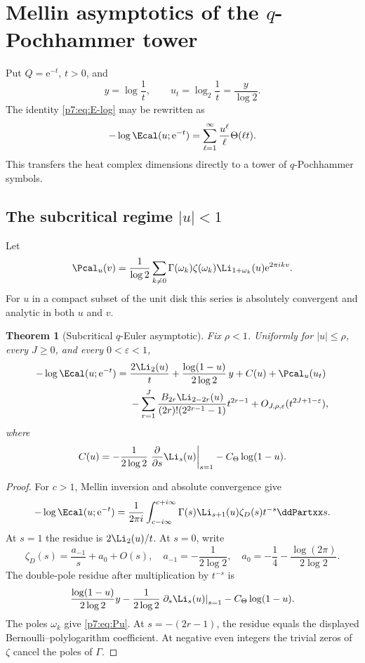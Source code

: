 \documentclass[11pt]{article}
\numberwithin{equation}{section}
\newtheorem{theorem}{Theorem}[section]
\theoremstyle{definition}
\theoremstyle{remark}
\newcommand{\e}{\mathrm e}
\begin{document}
\section{Mellin asymptotics of the $q$-Pochhammer tower}

Put $Q=\e^{-t}$, $t>0$, and
\[
 y=\log\frac1t,
 \qquad
 u_t=\log_2\frac1t=\frac y{\log2}.
\]
The identity \cref{p7:eq:E-log} may be rewritten as
\begin{equation}\label{p7:eq:E-Theta}
 -\log\Ecal(u;\e^{-t})
 =\sum_{\ell=1}^{\infty}\frac{u^\ell}{\ell}\Theta(\ell t).
\end{equation}
This transfers the heat complex dimensions directly to a tower of $q$-Pochhammer symbols.

\subsection{The subcritical regime $|u|<1$}

Let
\begin{equation}\label{p7:eq:Pu}
 \Pcal_u(v)=\frac1{\log2}
 \sum_{k\ne0}\Gamma(\omega_k)\zeta(\omega_k)
 \Li_{1+\omega_k}(u)\e^{2\pi ikv}.
\end{equation}
For $u$ in a compact subset of the unit disk this series is absolutely convergent and analytic in both $u$ and $v$.

\begin{theorem}[Subcritical $q$-Euler asymptotic]\label{p7:thm:E-subcritical}
Fix $\rho<1$.  Uniformly for $|u|\le\rho$, every $J\ge0$, and every $0<\varepsilon<1$,
\begin{align}\label{p7:eq:E-subcritical-asymp}
 -\log\Ecal(u;\e^{-t})
 ={}&\frac{2\Li_2(u)}t
 +\frac{\log(1-u)}{2\log2}\,y
 +C(u)+\Pcal_u(u_t)\\
 &-\sum_{r=1}^{J}
 \frac{B_{2r}\Li_{2-2r}(u)}{(2r)!(2^{2r-1}-1)}t^{2r-1}
 +O_{J,\rho,\varepsilon}(t^{2J+1-\varepsilon}),\notag
\end{align}
where
\begin{equation}\label{p7:eq:Cu}
 C(u)=-\frac1{2\log2}
 \left.\frac{\partial}{\partial s}\Li_s(u)\right|_{s=1}
 -C_\Theta\log(1-u).
\end{equation}
\end{theorem}

\begin{proof}
For $c>1$, Mellin inversion and absolute convergence give
\begin{equation}\label{p7:eq:E-Mellin}
 -\log\Ecal(u;\e^{-t})
 =\frac1{2\pi i}\int_{c-i\infty}^{c+i\infty}
 \Gamma(s)\Li_{s+1}(u)\zeta_D(s)t^{-s}\ddPartxx s.
\end{equation}
At $s=1$ the residue is $2\Li_2(u)/t$.  At $s=0$, write
\[
 \zeta_D(s)=\frac{a_{-1}}s+a_0+O(s),
 \quad
 a_{-1}=-\frac1{2\log2},
 \quad
 a_0=-\frac14-\frac{\log(2\pi)}{2\log2}.
\]
The double-pole residue after multiplication by $t^{-s}$ is
\[
 \frac{\log(1-u)}{2\log2}y
 -\frac1{2\log2}\left.\partial_s\Li_s(u)\right|_{s=1}
 -C_\Theta\log(1-u).
\]
The poles $\omega_k$ give \cref{p7:eq:Pu}.  At $s=-(2r-1)$, the residue equals the displayed Bernoulli--polylogarithm coefficient.  At negative even integers the trivial zeros of $\zeta$ cancel the poles of $\Gamma$.
\end{proof}
\end{document}
